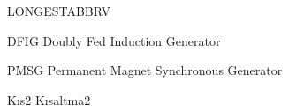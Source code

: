 \begin{theglossary}{LONGESTABBRV}
\item[DFIG] Doubly Fed Induction Generator
\item[PMSG] Permanent Magnet Synchronous Generator
\item[Kıs2] Kısaltma2
\end{theglossary}
